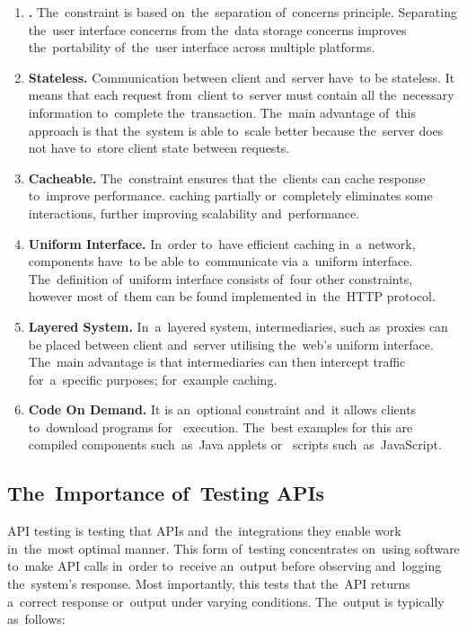 \begin{enumerate}
  \item \textbf{.} The~constraint is based
  on~the~separation of~concerns principle. Separating the~user interface
  concerns from the~data storage concerns improves the~portability of~the~user
  interface across multiple platforms.
  \item \textbf{Stateless.} Communication between client and~server have~to be
  stateless. It means that each request from~client to~server must contain all
  the~necessary information to~complete the~transaction. The~main advantage
  of~this approach is that the~system is able to~scale better because the~server
  does not have to~store client state between requests.
  \item \textbf{Cacheable.} The~constraint ensures that the~clients can cache
  response to~improve performance.  caching partially
  or~completely eliminates some  interactions, further
  improving scalability and~performance.
  \item \textbf{Uniform Interface.} In~order to~have efficient caching
  in~a~network, components have~to be able to~communicate via a~uniform
  interface.
  The~definition of~uniform interface consists of~four other constraints,
  however most of~them can be found implemented in~the~HTTP protocol.
  \item \textbf{Layered System.} In~a~layered system, intermediaries, such
  as~proxies can be placed between client and~server utilising the~web's uniform
  interface. The~main advantage is that intermediaries can then intercept
   traffic for~a~specific purposes; for~example caching.
  \item \textbf{Code On Demand.} It is an~optional constraint and~it allows
  clients to~download programs for~ execution. The~best examples
  for this are compiled components such~as~Java applets or~
  scripts such~as~JavaScript.
\end{enumerate}

\subsection{The~Importance of~Testing APIs}
API testing is testing that APIs and~the~integrations they enable work
in~the~most optimal manner. This form of~testing concentrates on~using software
to~make API calls in~order to~receive an~output before observing and~logging
the~system's response. Most importantly, this tests that the~API returns
a~correct response or~output under varying conditions. The~output is typically
as~follows:

